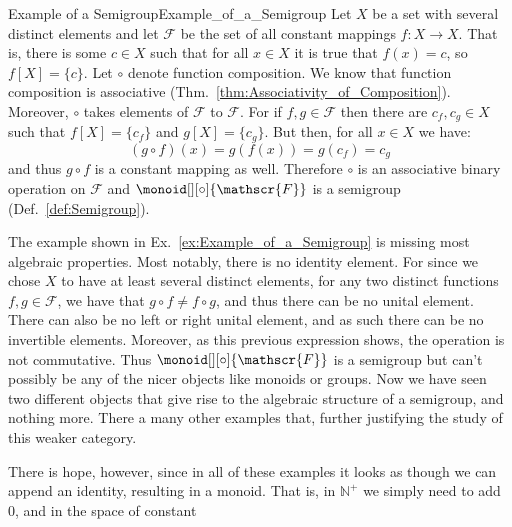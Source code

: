         \begin{fexample}{Example of a Semigroup}{Example_of_a_Semigroup}
            Let $X$ be a set with several distinct elements and let $\mathscr{F}$
            be the set of all constant mappings $f:X\rightarrow{X}$. That is,
            there is some $c\in{X}$ such that for all $x\in{X}$ it is true that
            $f(x)=c$, so $f[X]=\{c\}$. Let $\circ$ denote function composition.
            We know that function composition is associative
            (Thm.~\ref{thm:Associativity_of_Composition}). Moreover, $\circ$
            takes elements of $\mathscr{F}$ to $\mathscr{F}$. For if
            $f,g\in\mathscr{F}$ then there are $c_{f},c_{g}\in{X}$ such that
            $f[X]=\{c_{f}\}$ and $g[X]=\{c_{g}\}$. But then, for all $x\in{X}$
            we have:
            \begin{equation}
                (g\circ{f})(x)=g(f(x))=g(c_{f})=c_{g}
            \end{equation}
            and thus $g\circ{f}$ is a constant mapping as well. Therefore
            $\circ$ is an associative binary operation on $\mathscr{F}$ and
            $\monoid[][\circ]{\mathscr{F}}$ is a semigroup
            (Def.~\ref{def:Semigroup}).
        \end{fexample}
        The example shown in Ex.~\ref{ex:Example_of_a_Semigroup} is missing most
        algebraic properties. Most notably, there is no identity element. For
        since we chose $X$ to have at least several distinct elements, for any
        two distinct functions $f,g\in\mathscr{F}$, we have that
        $g\circ{f}\ne{f}\circ{g}$, and thus there can be no unital element.
        There can also be no left or right unital element, and as such there can
        be no invertible elements. Moreover, as this previous expression shows,
        the operation is not commutative. Thus $\monoid[][\circ]{\mathscr{F}}$
        is a semigroup but can't possibly be any of the nicer objects like
        monoids or groups. Now we have seen two different objects that give rise
        to the algebraic structure of a semigroup, and nothing more. There a
        many other examples that, further justifying the study of this weaker
        category.
        \par\hfill\par
        There is hope, however, since in all of these examples it looks as
        though we can append an identity, resulting in a monoid. That is, in
        $\mathbb{N}^{+}$ we simply need to add $0$, and in the space of constant
